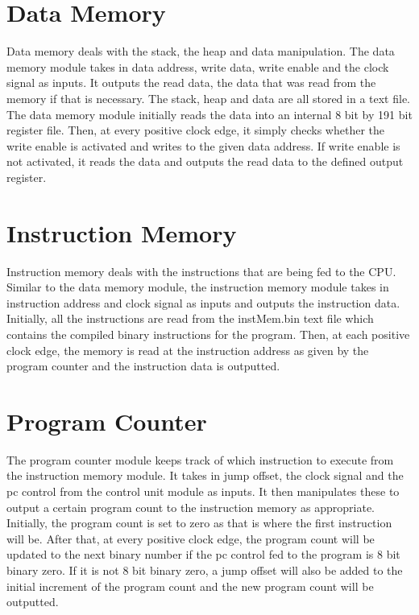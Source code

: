 \documentclass[journal]{IEEEtran}
\begin{document}
\section{Data Memory}
Data memory deals with the stack, the heap and data manipulation. The data memory module takes in data address, write data, write enable and the clock signal as inputs. It outputs the read  data, the data that was read from the memory if that is necessary. The stack, heap and data are all stored in a text file. The data memory module initially reads the data into an internal 8 bit by  191 bit register file. Then, at every positive clock edge, it simply checks whether the write enable is activated and writes to the given data address. If write enable is not activated, it reads the data and outputs the read data to the defined output register.

\newpage

\section{Instruction Memory}
Instruction memory deals with the instructions that are being fed to the CPU. Similar to the data memory module, the instruction memory module takes in instruction address and clock signal as inputs and outputs the instruction data. Initially, all the instructions are read from the instMem.bin text file which contains the compiled binary instructions for the program. Then, at each positive clock edge, the memory is read at the instruction address as given by the program counter and the instruction data is outputted.

\section{Program Counter}
The program counter module keeps track of which instruction to execute from the instruction memory module. It takes in jump offset, the clock signal and the pc control from the control unit module as inputs. It then manipulates these to output a certain program count to the instruction memory as appropriate. Initially, the program count is set to zero as that is where the first instruction will be. After that, at every positive clock edge, the program count will be updated to the next binary number if the pc control fed to  the program is 8 bit binary zero. If it is not 8 bit binary zero, a jump offset will also be added to the initial increment of the program count and the new program count will be outputted. 
\end{document}
